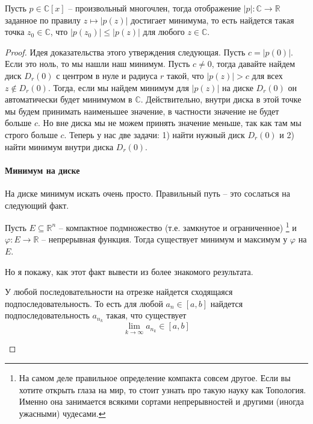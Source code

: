 \begin{claim}
Пусть $p\in \mathbb C[x]$ -- произвольный многочлен, тогда отображение $|p|\colon \mathbb C\to \mathbb R$ заданное по правилу $z\mapsto |p(z)|$ достигает минимума, то есть найдется такая точка $z_0\in\mathbb C$, что $|p(z_0)|\leqslant |p(z)|$ для любого $z\in \mathbb C$.
\end{claim}
\begin{proof}
Идея доказательства этого утверждения следующая.
Пусть $c = |p(0)|$.
Если это ноль, то мы нашли наш минимум.
Пусть $c\neq 0$, тогда давайте найдем диск $D_r(0)$ с центром в нуле и радиуса $r$ такой, что $|p(z)| > c$ для всех $z\notin D_r(0)$.
Тогда, если мы найдем минимум для $|p(z)|$ на диске $D_r(0)$ он автоматически будет минимумом в $\mathbb C$.
Действительно, внутри диска в этой точке мы будем принимать наименьшее значение, в частности значение не будет больше $c$.
Но вне диска мы не можем принять значение меньше, так как там мы строго больше $c$.
Теперь у нас две задачи: 1) найти нужный диск $D_r(0)$ и 2) найти минимум внутри диска $D_r(0)$.

\paragraph{Минимум на диске}

На диске минимум искать очень просто.
Правильный путь -- это сослаться на следующий факт.
\begin{claim*}
[БД]
Пусть $E\subseteq \mathbb R^n$ -- компактное подмножество (т.е. замкнутое и ограниченное)%
\footnote{На самом деле правильное определение компакта совсем другое.
Если вы хотите открыть глаза на мир, то стоит узнать про такую науку как Топология.
Именно она занимается всякими сортами непрерывностей и другими (иногда ужасными) чудесами.}
и $\varphi\colon E \to \mathbb R$ -- непрерывная функция.
Тогда существует минимум и максимум у $\varphi$ на $E$.
\end{claim*}

Но я покажу, как этот факт вывести из более знакомого результата.
\begin{claim*}
[БД]
У любой последовательности на отрезке найдется сходящаяся подпоследовательность.
То есть для любой $a_n\in [a, b]$ найдется подпоследовательность $a_{n_k}$ такая, что существует
\[
\lim_{k\to \infty}a_{n_k}\in [a, b]
\]
\end{claim*}


\end{proof}
